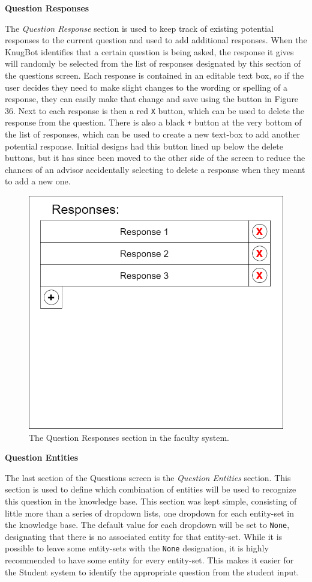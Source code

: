 \documentclass[titlepage, 12pt]{article}
\begin{document}
\textbf{Question Responses}

The \emph{Question Response} section is used to keep track of existing potential responses to the current question and used to add additional responses. When the KnugBot identifies that a certain question is being asked, the response it gives will randomly be selected from the list of responses designated by this section of the questions screen. Each response is contained in an editable text box, so if the user decides they need to make slight changes to the wording or spelling of a response, they can easily make that change and save using the button in Figure 36. Next to each response is then a red \texttt{X} button, which can be used to delete the response from the question. There is also a black \texttt{+} button at the very bottom of the list of responses, which can be used to create a new text-box to add another potential response. Initial designs had this button lined up below the delete buttons, but it has since been moved to the other side of the screen to reduce the chances of an advisor accidentally selecting to delete a response when they meant to add a new one.

\begin{figure}[h]
    \centering\includegraphics[width=0.75\linewidth]{images/system-design/faculty-questions-responses.png}
    \caption{The Question Responses section in the faculty system.}
\end{figure}

\textbf{Question Entities}

The last section of the Questions screen is the \emph{Question Entities} section. This section is used to define which combination of entities will be used to recognize this question in the knowledge base. This section was kept simple, consisting of little more than a series of dropdown lists, one dropdown for each entity-set in the knowledge base. The default value for each dropdown will be set to \texttt{None}, designating that there is no associated entity for that entity-set. While it is possible to leave some entity-sets with the \texttt{None} designation, it is highly recommended to have some entity for every entity-set. This makes it easier for the Student system to identify the appropriate question from the student input. 
\end{document}
